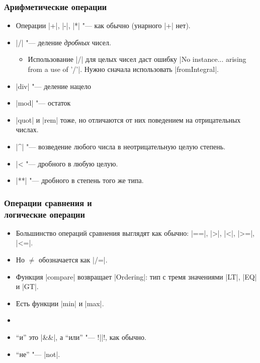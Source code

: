 \documentclass[10pt]{beamer}
\begin{document}
\begin{frame}[fragile]
  \frametitle{Арифметические операции}
  \begin{itemize}
    \item Операции \haskinline|+|, \haskinline|-|, \haskinline|*| "--- как обычно (унарного \haskinline|+| нет).
    \item \haskinline|/| "--- деление \emph{дробных} чисел.
          \begin{itemize}
            \item Использование \haskinline|/| для целых чисел даст ошибку \ghcinline|No instance... arising from a use of '/'|. Нужно сначала использовать \haskinline|fromIntegral|.
          \end{itemize}
    \item \haskinline|div| "--- деление нацело
    \item \haskinline|mod| "--- остаток
    \item
          \haskinline|quot| и \haskinline|rem| тоже, но отличаются от них поведением на отрицательных числах.
    \item \haskinline|^| "--- возведение любого числа в неотрицательную  целую степень.
    \item \haskinline|^^| "--- дробного в любую целую.
    \item \haskinline|**| "--- дробного в степень того же типа.
  \end{itemize}
\end{frame}

\begin{frame}[fragile]
  \frametitle{Операции сравнения и\\логические операции}
  \begin{itemize}
    \item Большинство операций сравнения выглядят как обычно: \haskinline|==|, \haskinline|>|, \haskinline|<|, \haskinline|>=|, \haskinline|<=|.
    \item Но $\neq$ обозначается как \haskinline|/=|.
    \item Функция \haskinline|compare| возвращает \haskinline|Ordering|: тип с тремя значениями \haskinline|LT|, \haskinline|EQ| и \haskinline|GT|.
    \item Есть функции \haskinline|min| и \haskinline|max|.
    \item[]
    \item \enquote{и} это \haskinline|&&|, а \enquote{или} "--- \haskinline!||!, как обычно.
    \item \enquote{не} "--- \haskinline|not|.
  \end{itemize}
\end{frame}

\end{document}
